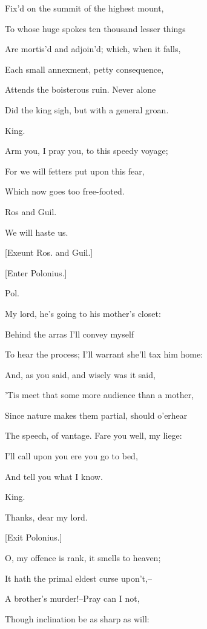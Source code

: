 \documentclass[12pt]{book}
\begin{document}
Fix'd on the summit of the highest mount,

To whose huge spokes ten thousand lesser things

Are mortis'd and adjoin'd; which, when it falls,

Each small annexment, petty consequence,

Attends the boisterous ruin. Never alone

Did the king sigh, but with a general groan.



King.

Arm you, I pray you, to this speedy voyage;

For we will fetters put upon this fear,

Which now goes too free-footed.



Ros and Guil.

We will haste us.



[Exeunt Ros. and Guil.]



[Enter Polonius.]



Pol.

My lord, he's going to his mother's closet:

Behind the arras I'll convey myself

To hear the process; I'll warrant she'll tax him home:

And, as you said, and wisely was it said,

'Tis meet that some more audience than a mother,

Since nature makes them partial, should o'erhear

The speech, of vantage. Fare you well, my liege:

I'll call upon you ere you go to bed,

And tell you what I know.



King.

Thanks, dear my lord.



[Exit Polonius.]



O, my offence is rank, it smells to heaven;

It hath the primal eldest curse upon't,--

A brother's murder!--Pray can I not,

Though inclination be as sharp as will:
\end{document}
